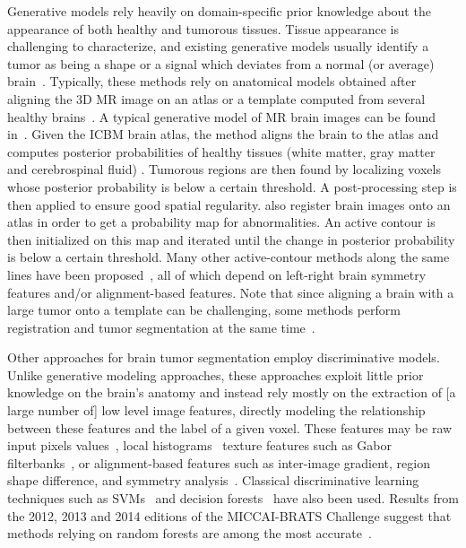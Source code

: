 \documentclass[final,5p,times,twocolumn]{elsarticle}
\begin{document}
Generative models rely heavily on domain-specific prior knowledge about the appearance of both healthy and tumorous tissues. Tissue appearance is challenging to characterize, and existing generative models usually identify a tumor as being a shape or a signal which deviates from a normal (or average) brain~\citep{Clark1998}. Typically, these methods rely on anatomical models obtained after aligning the 3D MR image on an atlas or a template computed from several healthy brains~\citep{Doyle2013}. A typical generative model of MR brain images can be found in~\citet{Prastawa2004}. Given the ICBM brain atlas, the method aligns the brain to the atlas and computes posterior probabilities of healthy tissues (white matter, gray matter and cerebrospinal fluid) . Tumorous regions are then found by localizing voxels whose posterior probability is below a certain threshold. A post-processing step is then applied to ensure good spatial regularity. \citet{prastawa2003b} also register brain images onto an atlas in order to get a probability map for abnormalities.  An active contour is then initialized on this map and iterated until the change in posterior probability is below a certain threshold. Many other active-contour methods along the same lines have been proposed~\citep{Khotanlou2009,Cobzas2007,Popuri2012}, all of which depend on left-right brain symmetry features and/or alignment-based features.  
Note that since aligning a brain with a large tumor onto a template can be challenging, some methods perform registration and tumor segmentation at the same time~\citep{Kwon2014,Parisot2012}.




Other approaches for brain tumor segmentation employ discriminative models.  Unlike generative modeling approaches, these approaches exploit little prior knowledge on the brain's anatomy and instead rely mostly on the extraction of [a large number of] low level image features, directly modeling the relationship between these features and the label of a given voxel.  These features may be raw input pixels values~\citep{Havaei2014,hamamci2012a}, local histograms~\citep{Kleesiek2014,Meier2014} texture features such as Gabor filterbanks~\citep{Subbanna2013,Subbanna2014}, or alignment-based features such as inter-image gradient, region shape difference, and symmetry analysis~\citep{ANTsandArboles}.  Classical discriminative learning techniques such as SVMs~\citep{Bauer2011,schmidt2005,Lee2005} and decision forests~\citep{zikic2012} have also been used.  Results from the 2012, 2013 and 2014 editions of the MICCAI-BRATS Challenge suggest that methods relying on random forests are among the most accurate~\citep{Menze2014,Gotz2014,Kleesiek2014}.  
\end{document}
